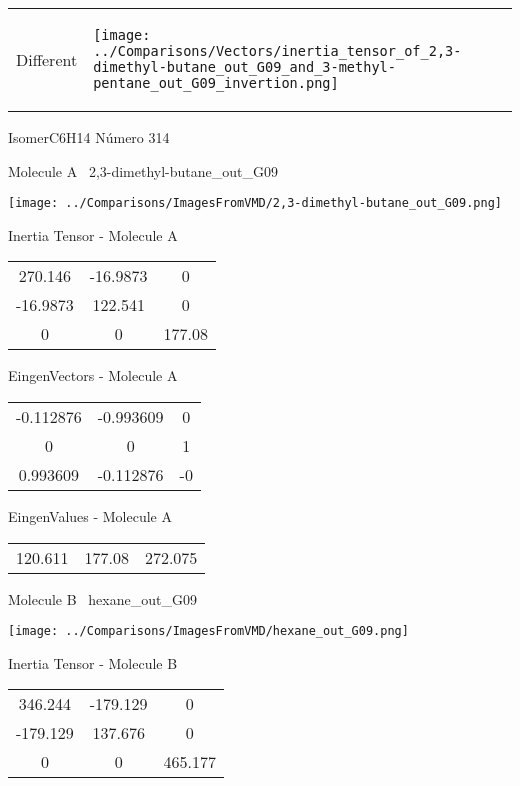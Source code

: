 \vtab[-5mm]
\begin{tabular}{*{2}{m{}}}
\begin{center}
\textcolor{NavyBlue}{\Large Different}
\end{center}
&
\begin{center}
\texttt{[image: ../Comparisons/Vectors/inertia\_tensor\_of\_2,3-dimethyl-butane\_out\_G09\_and\_3-methyl-pentane\_out\_G09\_invertion.png]}
\end{center}
\end{tabular}

 \newpage

\vtab[-3cm]
\begin{center}
{\large IsomerC6H14 \tab Número 314}
\end{center}
\begin{multicols}{2}
\begin{center}

Molecule A \
2,3-dimethyl-butane\_out\_G09

\texttt{[image: ../Comparisons/ImagesFromVMD/2,3-dimethyl-butane\_out\_G09.png]}

Inertia Tensor - Molecule A \\
\begin{tabular}{|c c c|}
270.146	 & 	-16.9873	 & 	0	 \\
-16.9873	 & 	122.541	 & 	0	 \\
0	 & 	0	 & 	177.08
\end{tabular}

\vtab
 EingenVectors - Molecule A     \\
\begin{tabular}{|c c c|}
-0.112876	 & 	-0.993609	 & 	0	 \\
0	 & 	0	 & 	1	 \\
0.993609	 & 	-0.112876	 & 	-0
\end{tabular}

\vtab
 EingenValues - Molecule A     \\
\begin{tabular}{|c c c|}
120.611	 & 	177.08	 & 	272.075	 \\
\end{tabular}
\columnbreak

Molecule B \
hexane\_out\_G09

\texttt{[image: ../Comparisons/ImagesFromVMD/hexane\_out\_G09.png]}

Inertia Tensor - Molecule B \\
\begin{tabular}{|c c c|}
346.244	 & 	-179.129	 & 	0	 \\
-179.129	 & 	137.676	 & 	0	 \\
0	 & 	0	 & 	465.177
\end{tabular}


\end{center}
\end{multicols}
